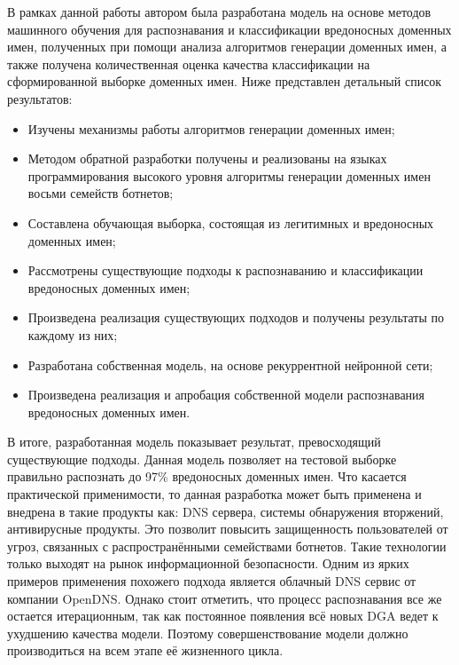 В рамках данной работы автором была разработана модель на основе методов машинного обучения для распознавания и классификации вредоносных доменных имен, полученных при помощи анализа алгоритмов генерации доменных имен, а также получена количественная оценка качества классификации на сформированной выборке доменных имен. Ниже представлен детальный список результатов:
\begin{itemize}
\item Изучены механизмы работы алгоритмов генерации доменных имен;
\item Методом обратной разработки получены и реализованы на языках программирования высокого уровня алгоритмы генерации доменных имен восьми семейств ботнетов;
\item Составлена обучающая выборка, состоящая из легитимных и вредоносных доменных имен;
\item Рассмотрены существующие подходы к распознаванию и классификации вредоносных доменных имен;
\item Произведена реализация существующих подходов и получены результаты по каждому из них;
\item Разработана собственная модель, на основе рекуррентной нейронной сети;
\item Произведена реализация и апробация собственной модели распознавания вредоносных доменных имен.
\end{itemize}

В итоге, разработанная модель показывает результат, превосходящий существующие подходы. Данная модель позволяет на тестовой выборке правильно распознать до 97\% вредоносных доменных имен.
Что касается практической применимости, то данная разработка может быть применена и внедрена в такие продукты как: DNS сервера, системы обнаружения вторжений, антивирусные продукты. Это позволит повысить защищенность пользователей от угроз, связанных с распространёнными семействами ботнетов. Такие технологии только выходят на рынок информационной безопасности. Одним из ярких примеров применения похожего подхода является облачный DNS сервис от компании OpenDNS. Однако стоит отметить, что процесс распознавания все же остается итерационным, так как постоянное появления всё новых DGA ведет к ухудшению качества модели. Поэтому совершенствование модели должно производиться на всем этапе её жизненного цикла.
\clearpage
